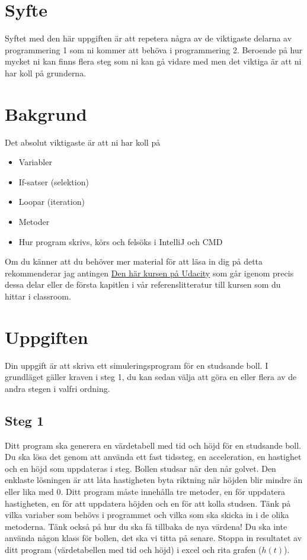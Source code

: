 \documentclass[11pt]{article}
\begin{document}
\section{Syfte}
    Syftet med den här uppgiften är att repetera några av de viktigaste delarna av programmering 1 som ni kommer att behöva
    i programmering 2. Beroende på hur mycket ni kan finns flera steg som ni kan gå vidare med men det viktiga är att ni har koll på grunderna.
\section{Bakgrund}
    Det absolut viktigaste är att ni har koll på
    \begin{itemize}
        \item Variabler
        \item If-satser (selektion)
        \item Loopar (iteration)
        \item Metoder
        \item Hur program skrivs, körs och felsöks i IntelliJ och CMD
    \end{itemize}
    Om du känner att du behöver mer material för att läsa in dig på detta rekommenderar jag antingen
    \href{https://classroom.udacity.com/courses/ud282}{Den här kursen på Udacity} som går igenom precis dessa delar eller
    de första kapitlen i vår referenslitteratur till kursen som du hittar i classroom.
\section{Uppgiften}
    Din uppgift är att skriva ett simuleringsprogram för en studsande boll. I grundläget gäller kraven i steg 1, du kan sedan
    välja att göra en eller flera av de andra stegen i valfri ordning.
    \subsection{Steg 1}
        Ditt program ska generera en värdetabell med tid och höjd för en studsande boll. Du ska lösa det genom att använda ett
        fast tidssteg, en acceleration, en hastighet och en höjd som uppdateras i steg. Bollen studsar när den når golvet.
        Den enklaste lösningen är att låta hastigheten byta riktning när höjden blir mindre än eller lika med 0. Ditt
        program måste innehålla tre metoder, en för uppdatera hastigheten, en för att uppdatera höjden och en för att kolla studsen.
        Tänk på vilka variaber som behövs i programmet och vilka som ska skicka in i de olika metoderna. Tänk också på hur
        du ska få tillbaka de nya värdena! Du ska inte använda någon klass för bollen, det ska vi titta på senare. Stoppa in
        resultatet av ditt program (värdetabellen med tid och höjd) i excel och rita grafen ($h(t)$).
\end{document}
